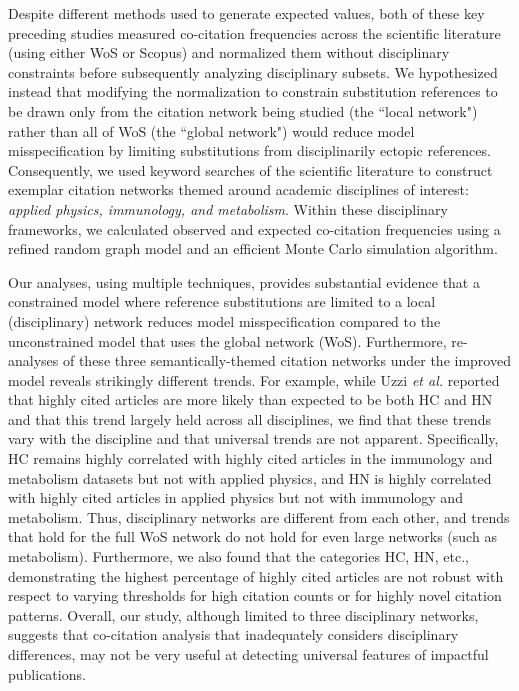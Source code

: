 \documentclass[NETN]{stjour}
\begin{document}
Despite different methods used to generate expected values, both of these key preceding studies measured co-citation frequencies across the scientific literature (using either WoS or Scopus) and normalized them without disciplinary constraints before subsequently analyzing disciplinary subsets. We hypothesized instead that modifying the normalization to constrain substitution references to be drawn only from the citation network being studied (the ``local network") rather than all of WoS
(the ``global network") would reduce model misspecification by limiting substitutions from disciplinarily ectopic references. Consequently, we used keyword searches of the scientific literature to construct exemplar citation networks themed around academic disciplines of interest: \emph{applied physics, immunology, and metabolism}. Within these disciplinary frameworks, we calculated observed and expected co-citation frequencies using a refined random graph model and an efficient Monte Carlo simulation algorithm.

Our analyses, using multiple techniques, provides substantial evidence that a constrained model where reference substitutions are limited to a local (disciplinary) network reduces model misspecification compared to the unconstrained model that uses the global network (WoS). Furthermore, re-analyses of these three semantically-themed citation networks  under the improved model reveals strikingly different trends. For example, while Uzzi {\em et al.} reported that highly cited articles are more likely than expected to be both HC and HN and that this trend largely held across all disciplines, we find that these trends vary with the discipline and that universal trends are not apparent. Specifically,  HC remains highly correlated with highly cited articles in the immunology and metabolism datasets but not with applied physics, and HN is highly correlated with highly cited articles in applied physics but not with immunology and metabolism.  Thus, disciplinary networks are different from each other, and trends that hold for the full WoS network do not hold for even large networks (such as metabolism).  Furthermore, we also found that the categories HC, HN, etc.,  demonstrating the highest percentage of highly cited articles are not robust with respect to varying thresholds for high citation counts or for highly novel citation patterns. Overall, our study, although limited to three disciplinary networks, suggests that co-citation analysis that inadequately considers disciplinary differences, may not be very useful at detecting universal features of impactful publications.
\end{document}
